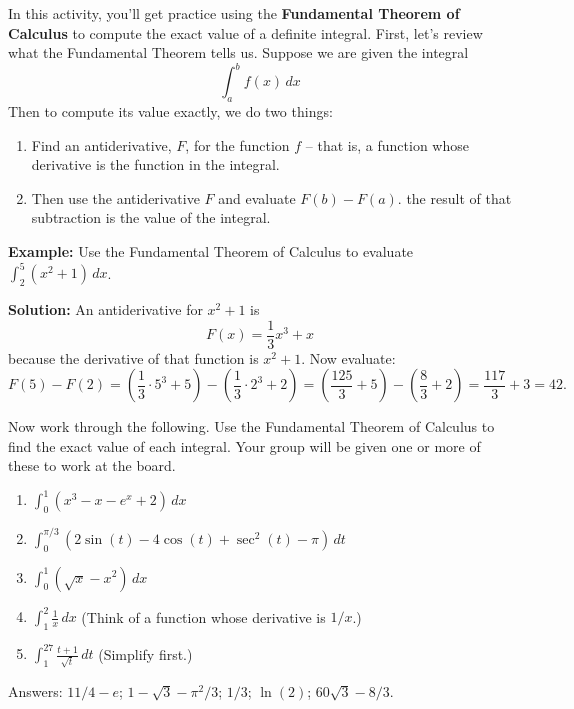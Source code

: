 \documentclass[11pt]{article}
\begin{document}
\noindent
In this activity, you'll get practice using the \textbf{Fundamental Theorem of Calculus} to compute the exact value of a definite integral. First, let's review what the Fundamental Theorem tells us. Suppose we are given the integral 
$$\int_a^b f(x) \, dx$$
Then to compute its value exactly, we do two things: 

\begin{enumerate}
    \item Find an antiderivative, $F$, for the function $f$ -- that is, a function whose derivative is the function in the integral. 
    \item Then use the antiderivative $F$ and evaluate $F(b) - F(a)$. the result of that subtraction is the value of the integral. 
\end{enumerate}

\begin{tcolorbox}
\textbf{Example:} Use the Fundamental Theorem of Calculus to evaluate $\displaystyle{\int_2^5 (x^2 + 1) \,dx}$.

\noindent
\textbf{Solution:} An antiderivative for $x^2 + 1$ is 
$$F(x) = \frac{1}{3}x^3 + x$$
because the derivative of that function is $x^2 + 1$. Now evaluate: 
$$F(5) - F(2) = \left( \frac{1}{3} \cdot 5^3 + 5 \right) - \left( \frac{1}{3} \cdot 2^3 + 2 \right)
= \left(\frac{125}{3} + 5 \right) - \left( \frac{8}{3} + 2 \right) = \frac{117}{3} + 3 = 42.$$

\end{tcolorbox}

Now work through the following. Use the Fundamental Theorem of Calculus to find the exact value of each integral. Your group will be given one or more of these to work at the board. 

\begin{enumerate}
    \item $\displaystyle{\int_0^1 (x^3 - x - e^x + 2) \, dx}$
    \item $\displaystyle{\int_0^{\pi/3} (2 \sin(t) - 4 \cos(t) + \sec^2 (t) - \pi) \, dt}$
    \item $\displaystyle{\int_0^1 (\sqrt{x} - x^2) \, dx}$
    \item $\displaystyle{\int_1^2 \frac{1}{x} \, dx}$  (Think of a function whose derivative is $1/x$.) 
    \item $\displaystyle{\int_1^{27} \frac{t+1}{\sqrt{t}}\, dt}$ (Simplify first.) 
\end{enumerate}

\begin{tcolorbox}
Answers: $11/4 - e$; $1 - \sqrt{3} - \pi^2/3$; $1/3$; $\ln(2)$; $60\sqrt{3} - 8/3$. 
\end{tcolorbox}
\end{document}
